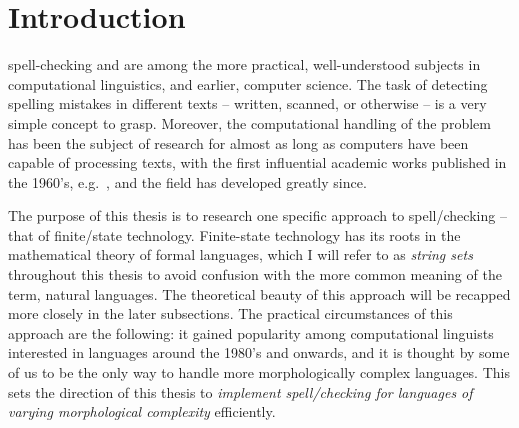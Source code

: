 \documentclass[officiallayout,final]{unihelcompling}
\begin{document}



\printglossaries

\chapter{Introduction}
\label{chap:introduction}

\Gls{spell-checking} and  are among
the more practical, well-understood subjects in \gls{computational
linguistics}, and earlier, computer science.  The task of detecting spelling
mistakes in different texts -- written, scanned, or otherwise -- is a very simple
concept to grasp. Moreover, the computational handling of the problem has been
the subject of research for almost as long as computers have been capable of
processing texts, with the first influential academic works published in the
1960's, e.g.~\cite{damerau1964technique}, and the field has developed greatly
since.

The purpose of this thesis is to research one specific approach to
spell\-/checking -- that of finite\-/state technology. Finite-state technology
has its roots in the mathematical theory of \glspl{formal language}, which I
will refer to as \emph{string sets} throughout this thesis to avoid confusion
with the more common meaning of the term, \glspl{natural language}. The
theoretical beauty of this approach will be recapped more closely in the later
subsections.  The practical circumstances of this approach are the following:
it gained popularity among computational linguists interested in
 languages around
the 1980's and onwards, and it is thought by some of us to be the only way to
handle more morphologically complex languages. This sets the direction of this
thesis to \emph{implement spell\-/checking for languages of varying
morphological complexity} efficiently.
\end{document}
